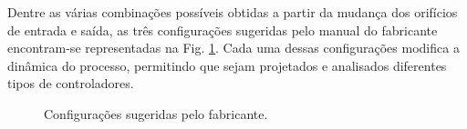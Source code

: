Dentre as várias combinações possíveis obtidas a partir da mudança dos orifícios
de entrada e saída, as três configurações sugeridas pelo manual do fabricante
encontram-se representadas na Fig. \ref{fig:config_fab}. Cada uma dessas
configurações modifica a dinâmica do processo, permitindo que sejam projetados e
analisados diferentes tipos de controladores.

\begin{figure}[!htb]
\centering
{}
\caption{Configurações sugeridas pelo fabricante.}
\label{fig:config_fab}
\end{figure}

